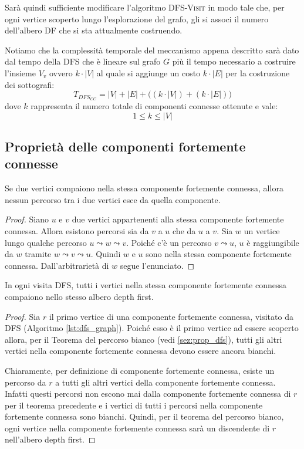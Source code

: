 Sarà quindi sufficiente modificare l'algoritmo \textsc{DFS-Visit} in modo tale che, per ogni vertice scoperto lungo l'esplorazione del grafo, gli si associ il numero dell'albero DF che si sta attualmente costruendo.

Notiamo che la complessità temporale del meccanismo appena descritto sarà dato dal tempo della DFS che è lineare sul grafo $G$ più il tempo necessario a costruire l'insieme $V_{v}$ ovvero $k \cdot |V|$ al quale si aggiunge un costo $k \cdot |E|$ per la costruzione dei sottografi:
\begin{displaymath}
	T_{DFS_{CC}} = |V|+|E| + \bigl((k \cdot |V|) + (k\cdot|E|)\bigr)
\end{displaymath}
dove $k$ rappresenta il numero totale di componenti connesse ottenute e vale:
\begin{displaymath}
	1 \leq k \leq |V|
\end{displaymath}

\subsection{Proprietà delle componenti fortemente connesse}
\begin{teorbox}
	Se due vertici compaiono nella stessa componente fortemente connessa, allora nessun percorso tra i due vertici esce da quella componente.
\end{teorbox}

\begin{proof}
	Siano $u$ e $v$ due vertici appartenenti alla stessa componente fortemente connessa. Allora esistono percorsi sia da $v$ a $u$ che da $u$ a $v$. Sia $w$ un vertice lungo qualche percorso $	u \leadsto w \leadsto v$. Poiché c'è un percorso $v \leadsto u$, $u$ è raggiungibile da $w$ tramite $w \leadsto v \leadsto u$. Quindi $w$ e $u$ sono nella stessa componente fortemente connessa. Dall'arbitrarietà di $w$ segue l'enunciato.
\end{proof}

\begin{teorbox}
		In ogni visita DFS, tutti i vertici nella stessa componente fortemente connessa compaiono nello stesso albero depth first.
\end{teorbox}

\begin{proof}
	Sia $r$ il primo vertice di una componente fortemente connessa, visitato da \textsc{DFS} (Algoritmo \ref{lst:dfs_graph}). Poiché esso è il primo vertice ad essere scoperto allora, per il Teorema del percorso bianco (vedi \ref{sez:prop_dfs}), tutti gli altri vertici nella componente fortemente connessa devono essere ancora bianchi.

Chiaramente, per definizione di componente fortemente connessa, esiste un percorso da $r$ a tutti gli altri vertici della componente fortemente connessa. Infatti questi percorsi non escono mai dalla componente fortemente connessa di $r$ per il teorema precedente e i vertici di tutti i percorsi nella componente fortemente connessa sono bianchi. Quindi, per il teorema del percorso bianco, ogni vertice nella componente fortemente connessa sarà un discendente di $r$ nell'albero depth first.
\end{proof}

